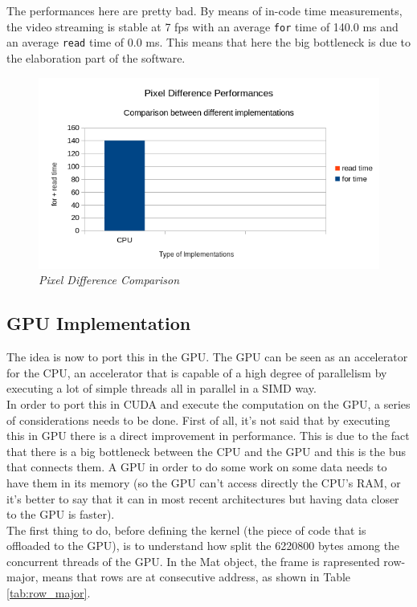 \documentclass[paper=a4, fontsize=10pt]{scrartcl}	%
\begin{document}
	The performances here are pretty bad. By means of in-code time measurements, the video streaming is stable at 7 fps with an average \texttt{for} time of 140.0 ms and an average \texttt{read} time of 0.0 ms. This means that here the big bottleneck is due to the elaboration part of the software.

	\begin{figure}[H]
		\centering
		\includegraphics[width=0.8\linewidth]{images/chart1.png}
		\caption{\textit{Pixel Difference Comparison}}
	\end{figure}

	\subsection{GPU Implementation}
	The idea is now to port this in the GPU. The GPU can be seen as an accelerator for the CPU, an accelerator that is capable of a high degree of parallelism by executing a lot of simple threads all in parallel in a SIMD way.\\

	In order to port this in CUDA and execute the computation on the GPU, a series of considerations needs to be done. First of all, it's not said that by executing this in GPU there is a direct improvement in performance. This is due to the fact that there is a big bottleneck between the CPU and the GPU and this is the bus that connects them. A GPU in order to do some work on some data needs to have them in its memory (so the GPU can't access directly the CPU's RAM, or it's better to say that it can in most recent architectures but having data closer to the GPU is faster).\\

	The first thing to do, before defining the kernel (the piece of code that is offloaded to the GPU), is to understand how split the 6220800 bytes among the concurrent threads of the GPU. In the Mat object, the frame is rapresented row-major, means that rows are at consecutive address, as shown in Table \ref{tab:row_major}.
\end{document}
